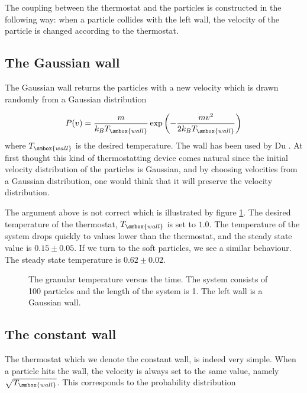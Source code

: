 The coupling between the thermostat and the particles is constructed
in the following way: when a particle collides with the left wall, the
velocity of the particle is changed according to the thermostat. 


\subsection{The Gaussian wall}
\label{sect:GaussWall}
The Gaussian wall returns the particles with a new velocity which is
drawn randomly from a Gaussian distribution \ie

\begin{equation}
  P(v) = \frac{m}{k_B T_{\smbox{wall}}} \exp\left(-\frac{mv^2}{2k_B
      T_{\smbox{wall}}}\right) 
\end{equation}
where $T_{\smbox{wall}}$ is the desired temperature. The wall has been
used by Du \etal \cite{Du95}. At first thought this kind of
thermostatting device comes natural since the initial velocity
distribution of the particles is Gaussian, and by choosing velocities
from a Gaussian distribution, one would think that it will preserve
the velocity distribution.

The argument above is not correct which is illustrated by figure
\ref{fig:GaussWall}. The desired temperature of the thermostat,
$T_{\smbox{wall}}$ is set to $1.0$. The temperature of the system
drops quickly to values lower than the thermostat, and the
steady state value is $0.15 \pm 0.05$. If we turn to the soft
particles, we see a similar behaviour. The steady state temperature is
$0.62 \pm 0.02$.

\begin{figure}
  \begin{center}
  \end{center}
  \caption[The Gaussian wall]{The granular temperature versus the time.
    The system consists of 100 particles and the length of the system is
    1. The left wall is a Gaussian wall.\label{fig:GaussWall}} 
\end{figure}


\subsection{The constant wall}
\label{sect:ConstWall}
The thermostat which we denote the constant wall, is indeed very
simple. When a particle hits the wall, the velocity is always set to
the same value, namely $\sqrt{T_{\smbox{wall}}}$. This corresponds to
the probability distribution

